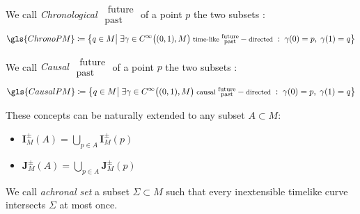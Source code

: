 \documentclass[Main]{subfiles}
\begin{document}
			\begin{definition}
				We call \emph{Chronological $\substack{\textrm{ future}\\ \textrm{past } }$}  of a point $p$ the two subsets :
				\begin{displaymath}
					\gls{ChronoPM}\coloneqq \big\{ q \in M \big\vert \; \exists \gamma \in C^\infty\big((0,1), M\big)\;  \textrm{\footnotesize time-like } \substack{\textrm{future}\\ \textrm{past} } -\textrm{\footnotesize directed }:\; \gamma(0)=p,\; \gamma(1)=q  \big\}
				\end{displaymath}
			\end{definition}
	
			\begin{definition}
				We call \emph{Causal $\substack{\textrm{ future}\\ \textrm{past } }$}  of a point $p$ the two subsets :
				\begin{displaymath}
					\gls{CausalPM} \coloneqq \big\{ q \in M \big\vert \; \exists \gamma \in C^\infty\big((0,1), M\big)\; \textrm{\footnotesize causal } \substack{\textrm{future}\\ \textrm{past} } -\textrm{\footnotesize directed }:
					\; \gamma(0)=p,\; \gamma(1)=q  \big\}
				\end{displaymath}		
			\end{definition}
				These concepts can be naturally extended to any subset $A \subset M$:
				\begin{itemize}
					\item $\mathbf{I}_M^\pm(A) = \bigcup_{p\in A} \mathbf{I}_M^\pm(p) $
					\item $\mathbf{J}_M^\pm(A) = \bigcup_{p\in A} \mathbf{J}_M^\pm(p) $
				\end{itemize}

			\begin{definition}
				We call \emph{achronal set} a subset $\Sigma \subset M$ such that every inextensible timelike curve intersects $\Sigma$ at most once.
			\end{definition}
\end{document}
